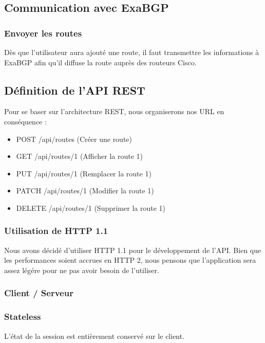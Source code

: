 \subsection{Communication avec ExaBGP}

\subsubsection{Envoyer les routes}
Dès que l'utilisateur aura ajouté une route, il faut transmettre les informations à ExaBGP afin qu'il diffuse la route auprès des routeurs Cisco.



\subsection{Définition de l'API REST}
Pour se baser sur l'architecture REST, nous organiserons nos URL en conséquence :
\begin{itemize}
    \item POST /api/routes (Créer une route)
    \item GET /api/routes/1 (Afficher la route 1)
    \item PUT /api/routes/1 (Remplacer la route 1)
    \item PATCH /api/routes/1 (Modifier la route 1)
    \item DELETE /api/routes/1 (Supprimer la route 1)
\end{itemize}

\subsubsection{Utilisation de HTTP 1.1}
Nous avons décidé d'utiliser HTTP 1.1 pour le développement de l'API. Bien que les performances soient accrues en HTTP 2, nous pensons que l'application sera assez légére pour ne pas avoir besoin de l'utiliser.

\subsubsection{Client / Serveur}


\subsubsection{Stateless}
L’état de la session est entièrement conservé sur le client.

